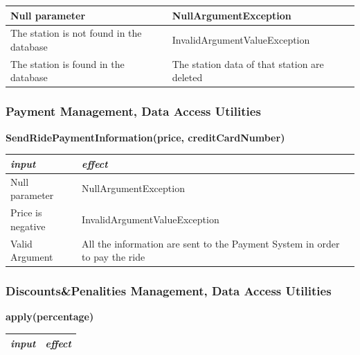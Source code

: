 \documentclass{article}
\begin{document}
\begin{flushleft}
\begin{center}
\begin{tabular}{  |  p{6cm} | p{6cm} |}
    Null parameter & NullArgumentException
     \\ 
  \hline
  The station is not found in the database &  InvalidArgumentValueException  \\
  \hline
  The station is found in the database & The station data of that station are deleted
   \\
  \hline
    \end{tabular}
\end{center}
      
      
      
      
      
      
    
      
      
      
       \subsubsection{Payment Management, Data Access Utilities}
       
       
       \begin{center}
   \begin {flushleft}
    \textbf{SendRidePaymentInformation(price, creditCardNumber)}
    \end{flushleft}
        \begin{tabular}{  |  p{6cm} | p{6cm} |}
    \hline
    \textit{input} &  \textit{effect} \\
    \hline
    
    Null parameter & NullArgumentException 
     \\ 
  \hline
  Price is negative & InvalidArgumentValueException   \\
  \hline
 Valid Argument &  All the information are sent to the Payment System in order  to pay the ride   \\
  \hline
    \end{tabular}
\end{center}
       
       
       
       
       
        \subsubsection{Discounts\&Penalities Management, Data Access Utilities}
        
        
        \begin{center}
   \begin {flushleft}
    \textbf{apply(percentage)}
    \end{flushleft}
        \begin{tabular}{  |  p{6cm} | p{6cm} |}
    \hline
    \textit{input} &  \textit{effect} \\
    \hline
    

\end{tabular}
\end{center}
\end{flushleft}
\end{document}
